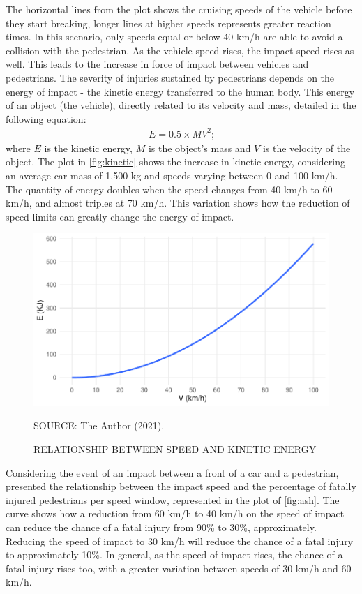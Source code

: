 The horizontal lines from the plot shows the cruising speeds of the vehicle before they start breaking, longer lines at higher speeds represents greater reaction times. In this scenario, only speeds equal or below 40 km/h are able to avoid a collision with the pedestrian. As the vehicle speed rises, the impact speed rises as well. This leads to the increase in force of impact between vehicles and pedestrians. The severity of injuries sustained by pedestrians depends on the energy of impact - the kinetic energy transferred to the human body. This energy of an object (the vehicle), directly related to its velocity and mass, detailed in the following equation: \begin{align}
    E = 0.5 \times MV^2 \mbox{;}
    \label{eq:energy}
\end{align} where $E$ is the kinetic energy, $M$ is the object's mass and $V$ is the velocity of the object. The plot in \autoref{fig:kinetic} shows the increase in kinetic energy, considering an average car mass of 1,500 kg \cite{Zervas2008} and speeds varying between 0 and 100 km/h. The quantity of energy doubles when the speed changes from 40 km/h to 60 km/h, and almost triples at 70 km/h. This variation shows how the reduction of speed limits can greatly change the energy of impact.

\begin{figure}[!htbp]
    \centering\footnotesize
    \captionsetup{font=footnotesize}
    \caption{RELATIONSHIP BETWEEN SPEED AND KINETIC ENERGY}
    \includegraphics{fig/kinetic.pdf}
    \label{fig:kinetic}
    \par SOURCE: The Author (2021).
\end{figure}

Considering the event of an impact between a front of a car and a pedestrian, \textcite{Ashton1980} presented the relationship between the impact speed and the percentage of fatally injured pedestrians per speed window, represented in the plot of \autoref{fig:ash}. The curve shows how a reduction from 60 km/h to 40 km/h on the speed of impact can reduce the chance of a fatal injury from 90\% to 30\%, approximately. Reducing the speed of impact to 30 km/h will reduce the chance of a fatal injury to approximately 10\%. In general, as the speed of impact rises, the chance of a fatal injury rises too, with a greater variation between speeds of 30 km/h and 60 km/h. 

